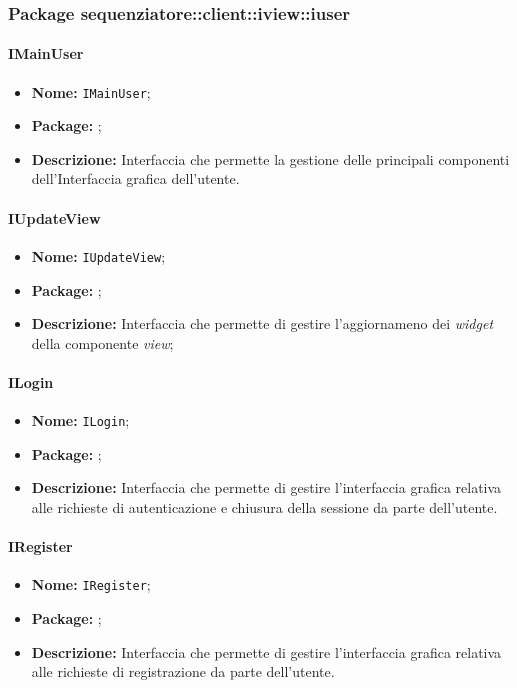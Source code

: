 \subsubsection{Package sequenziatore::client::iview::iuser}

\paragraph{IMainUser}
\begin{itemize}
\item \textbf{Nome:} \texttt{IMainUser};
\item \textbf{Package:} \texttt{\iViewUser{}};
\item \textbf{Descrizione:} Interfaccia che permette la gestione delle principali componenti dell'Interfaccia grafica dell'utente.
\end{itemize}

\paragraph{IUpdateView}
\begin{itemize}
\item \textbf{Nome:} \texttt{IUpdateView};
\item \textbf{Package:} \texttt{\iViewUser{}};
\item \textbf{Descrizione:} Interfaccia che permette di gestire l’aggiornameno dei \textit{widget} della componente \textit{view};
\end{itemize}

\paragraph{ILogin}
\begin{itemize}
\item \textbf{Nome:} \texttt{ILogin};
\item \textbf{Package:} \texttt{\iViewUser{}};
\item \textbf{Descrizione:} Interfaccia che permette di gestire l'interfaccia grafica relativa alle richieste di autenticazione e chiusura della sessione da parte dell'utente.
\end{itemize}

\paragraph{IRegister}
\begin{itemize}
\item \textbf{Nome:} \texttt{IRegister};
\item \textbf{Package:} \texttt{\iViewUser{}};
\item \textbf{Descrizione:} Interfaccia che permette di gestire l'interfaccia grafica relativa alle richieste di registrazione da parte dell'utente.
\end{itemize}

